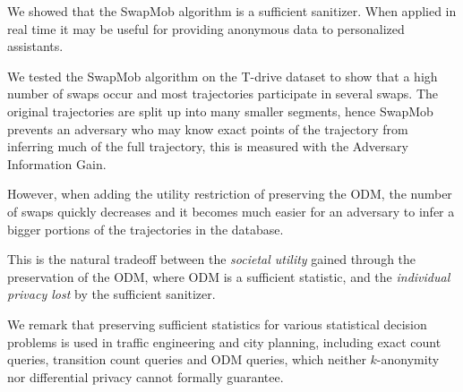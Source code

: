 \documentclass[times,twocolumn,final,authoryear]{elsarticle}
\begin{document}
We showed that the SwapMob algorithm is a sufficient sanitizer. When applied in real time it may be useful for providing anonymous data to personalized assistants. 

We tested the SwapMob algorithm on the T-drive dataset to show that a high number of swaps occur and
most trajectories participate in several swaps. The
original trajectories are split up into many smaller segments, hence SwapMob prevents an adversary who may know exact points of the trajectory from inferring much of the full trajectory, this is measured with the Adversary Information Gain.


However, when adding
the utility restriction of preserving the ODM, the number of swaps quickly
decreases and it becomes much easier for an
adversary to infer a bigger portions of the trajectories in the database.

This is the natural tradeoff between the {\em societal utility} gained through the preservation of the ODM, where ODM is a sufficient statistic, and the {\em individual privacy lost} by the sufficient sanitizer.





We remark that preserving sufficient statistics for various statistical decision problems is used in traffic engineering and city planning, including exact count queries, transition count queries and ODM queries, which neither $k$-anonymity nor differential privacy cannot formally guarantee.
\end{document}
